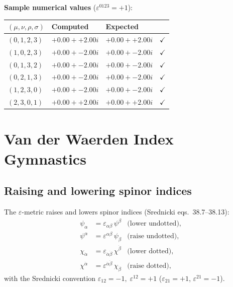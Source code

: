 \textbf{Sample numerical values} ($\varepsilon^{0123}=+1$):
\medskip
\begin{center}
\begin{tabular}{@{}llll@{}}
  \toprule
  $(\mu,\nu,\rho,\sigma)$ & Computed & Expected & \\
  \midrule
  $(0,1,2,3)$ & $+0.00++2.00i$ & $+0.00++2.00i$ & $\checkmark$ \\
  $(1,0,2,3)$ & $+0.00+-2.00i$ & $+0.00+-2.00i$ & $\checkmark$ \\
  $(0,1,3,2)$ & $+0.00+-2.00i$ & $+0.00+-2.00i$ & $\checkmark$ \\
  $(0,2,1,3)$ & $+0.00+-2.00i$ & $+0.00+-2.00i$ & $\checkmark$ \\
  $(1,2,3,0)$ & $+0.00+-2.00i$ & $+0.00+-2.00i$ & $\checkmark$ \\
  $(2,3,0,1)$ & $+0.00++2.00i$ & $+0.00++2.00i$ & $\checkmark$ \\
  \bottomrule
\end{tabular}
\end{center}

\section{Van der Waerden Index Gymnastics}

\subsection{Raising and lowering spinor indices}

The $\varepsilon$-metric raises and lowers spinor indices
(Srednicki eqs.~38.7--38.13):
\begin{align}
  \psi_\alpha &= \varepsilon_{\alpha\beta}\,\psi^\beta
  &\text{(lower undotted)},
  \tag{38.7}\\
  \psi^\alpha &= \varepsilon^{\alpha\beta}\,\psi_\beta
  &\text{(raise undotted)},
  \tag{38.8}\\
  \chi_{\dot\alpha} &= \varepsilon_{\dot\alpha\dot\beta}\,\chi^{\dot\beta}
  &\text{(lower dotted)},
  \tag{38.9}\\
  \chi^{\dot\alpha} &= \varepsilon^{\dot\alpha\dot\beta}\,\chi_{\dot\beta}
  &\text{(raise dotted)},
  \tag{38.10}
\end{align}
with the Srednicki convention
$\varepsilon_{12}=-1,\;\varepsilon^{12}=+1$
($\varepsilon_{21}=+1$, $\varepsilon^{21}=-1$).

